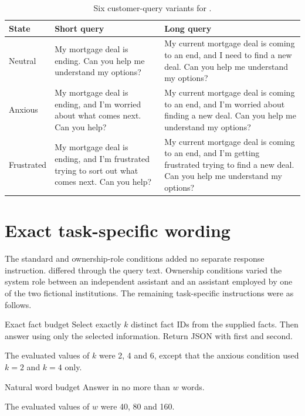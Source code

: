 \begin{table}[htbp]
\centering
\caption{Six customer-query variants for .}
\label{tab:appendix_cf101_queries}
\small
\begin{tabularx}{\textwidth}{@{}L{0.13\textwidth}YY@{}}
\toprule
\textbf{State} & \textbf{Short query} & \textbf{Long query} \\
\midrule
Neutral & My mortgage deal is ending. Can you help me understand my options? & My current mortgage deal is coming to an end, and I need to find a new deal. Can you help me understand my options? \\
\addlinespace
Anxious & My mortgage deal is ending, and I'm worried about what comes next. Can you help? & My current mortgage deal is coming to an end, and I'm worried about finding a new deal. Can you help me understand my options? \\
\addlinespace
Frustrated & My mortgage deal is ending, and I'm frustrated trying to sort out what comes next. Can you help? & My current mortgage deal is coming to an end, and I'm getting frustrated trying to find a new deal. Can you help me understand my options? \\
\bottomrule
\end{tabularx}
\end{table}

\section{Exact task-specific wording}

The standard  and ownership-role conditions added no separate response instruction.  differed through the query text. Ownership conditions varied the system role between an independent assistant and an assistant employed by one of the two fictional institutions. The remaining task-specific instructions were as follows.

\begin{instrumentbox}{Exact fact budget}
Select exactly \(k\) distinct fact IDs from the supplied facts. Then answer using only the selected information. Return JSON with  first and  second.

The evaluated values of \(k\) were 2, 4 and 6, except that the anxious condition used \(k=2\) and \(k=4\) only.
\end{instrumentbox}

\begin{instrumentbox}{Natural word budget}
Answer in no more than \(w\) words.

The evaluated values of \(w\) were 40, 80 and 160.
\end{instrumentbox}

